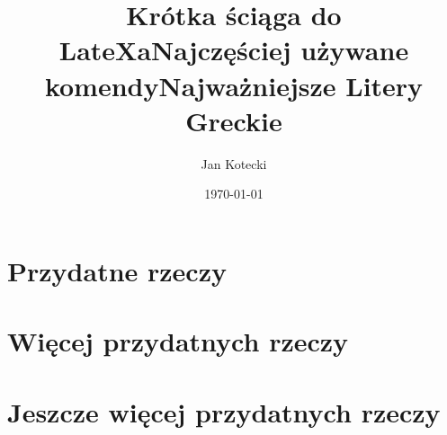 \documentclass{article}
\begin{document}
\title{Krótka ściąga do LateXa}

\author{Jan Kotecki}
\date{\today}

\maketitle
\section{Przydatne rzeczy}
\section{Więcej przydatnych rzeczy}
\section{Jeszcze więcej przydatnych rzeczy}

\begin{center}
\newpage

\title{\Large Najczęściej używane komendy}
\maketitle
\end{center}


\begin{center}
\title{\Huge Najważniejsze Litery Greckie}
\maketitle
\end{center}
\end{document}
